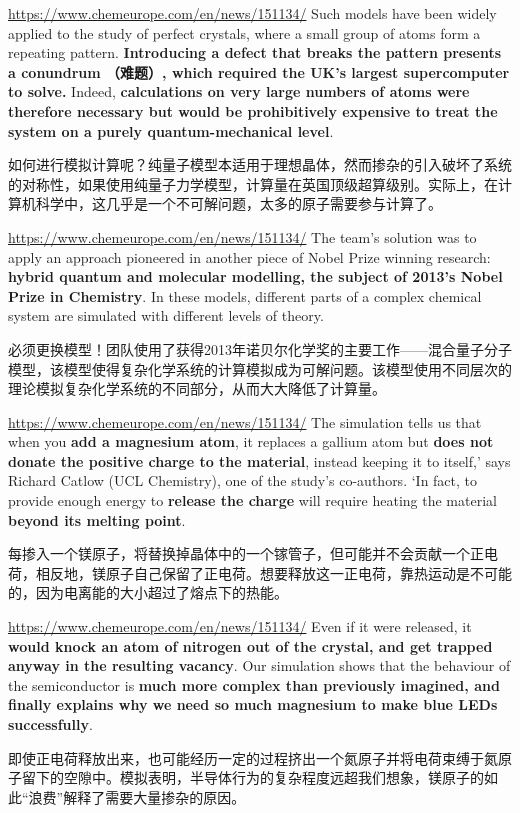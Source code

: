 \documentclass{beamer}
\newenvironment{slide}{
    \begin{frame}{\bfseries{\sectiontitle}}
}{
    \end{frame}
}
\begin{document}
\begin{slide}{\url{https://www.chemeurope.com/en/news/151134/}}
    Such models have been widely applied to the study of perfect crystals, where a small group of atoms form a repeating pattern. \textbf{Introducing a defect that breaks the pattern presents a conundrum （难题）, which required the UK's largest supercomputer to solve.} Indeed, \textbf{calculations on very large numbers of atoms were therefore necessary but would be prohibitively expensive to treat the system on a purely quantum-mechanical level}.
    \bigskip

    如何进行模拟计算呢？纯量子模型本适用于理想晶体，然而掺杂的引入破坏了系统的对称性，如果使用纯量子力学模型，计算量在英国顶级超算级别。实际上，在计算机科学中，这几乎是一个不可解问题，太多的原子需要参与计算了。
\end{slide}

\begin{slide}{\url{https://www.chemeurope.com/en/news/151134/}}
    The team's solution was to apply an approach pioneered in another piece of Nobel Prize winning research: \textbf{hybrid quantum and molecular modelling, the subject of 2013's Nobel Prize in Chemistry}. In these models, different parts of a complex chemical system are simulated with different levels of theory.
    \bigskip

    必须更换模型！团队使用了获得2013年诺贝尔化学奖的主要工作——混合量子分子模型，该模型使得复杂化学系统的计算模拟成为可解问题。该模型使用不同层次的理论模拟复杂化学系统的不同部分，从而大大降低了计算量。
\end{slide}

\begin{slide}{\url{https://www.chemeurope.com/en/news/151134/}}
    The simulation tells us that when you \textbf{add a magnesium atom}, it replaces a gallium atom but \textbf{does not donate the positive charge to the material}, instead keeping it to itself,' says Richard Catlow (UCL Chemistry), one of the study's co-authors. `In fact, to provide enough energy to \textbf{release the charge} will require heating the material \textbf{beyond its melting point}.
    \bigskip

    每掺入一个镁原子，将替换掉晶体中的一个镓管子，但可能并不会贡献一个正电荷，相反地，镁原子自己保留了正电荷。想要释放这一正电荷，靠热运动是不可能的，因为电离能的大小超过了熔点下的热能。
\end{slide}

\begin{slide}{\url{https://www.chemeurope.com/en/news/151134/}}
    Even if it were released, it \textbf{would knock an atom of nitrogen out of the crystal, and get trapped anyway in the resulting vacancy}. Our simulation shows that the behaviour of the semiconductor is \textbf{much more complex than previously imagined, and finally explains why we need so much magnesium to make blue LEDs successfully}.
    \bigskip

    即使正电荷释放出来，也可能经历一定的过程挤出一个氮原子并将电荷束缚于氮原子留下的空隙中。模拟表明，半导体行为的复杂程度远超我们想象，镁原子的如此“浪费”解释了需要大量掺杂的原因。
\end{slide}
\end{document}
